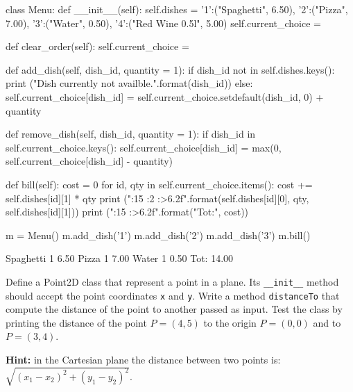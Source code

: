 \cprotEnv\begin{solution}
\begin{ipython}
class Menu:
    def __init__(self):
        self.dishes = {'1':("Spaghetti", 6.50), '2':("Pizza", 7.00), '3':("Water", 0.50),
                       '4':("Red Wine 0.5l", 5.00)}
        self.current_choice = {}
        
    def clear_order(self):
        self.current_choice = {}
        
    def add_dish(self, dish_id, quantity = 1):
        if dish_id not in self.dishes.keys():
            print ("Dish {} currently not availble.".format(dish_id))
        else:
            self.current_choice[dish_id] = 
                self.current_choice.setdefault(dish_id, 0) + quantity
            
    def remove_dish(self, dish_id, quantity = 1):
        if dish_id in self.current_choice.keys():
            self.current_choice[dish_id] = max(0, self.current_choice[dish_id] - quantity)
            
    def bill(self):
        cost = 0
        for id, qty in self.current_choice.items():
            cost += self.dishes[id][1] * qty
            print ("{:15} {:2} {:>6.2f}".format(self.dishes[id][0],
                                                qty,
                                                self.dishes[id][1]))
        print ("{:15}    {:>6.2f}".format("Tot:", cost))

m = Menu()
m.add_dish('1')
m.add_dish('2')
m.add_dish('3')
m.bill()
\end{ipython}
\begin{ioutput}
Spaghetti        1   6.50
Pizza            1   7.00
Water            1   0.50
Tot:                14.00
\end{ioutput}
\end{solution}

\begin{question}
Define a Point2D class that represent a point in a plane. Its \texttt{\_\_init\_\_} method should accept the point coordinates \texttt{x} and \texttt{y}. Write a method \texttt{distanceTo} that compute the distance of the point to another passed as input. Test the class by printing the distance of the point \(P=(4, 5)\) to the origin \(P=(0,0)\) and to \(P=(3,4)\).

\noindent\textbf{Hint:} in the Cartesian plane the distance between two points is: $\sqrt{(x_1 - x_2)^2 + (y_1 - y_2)^2}$.
\end{question}

